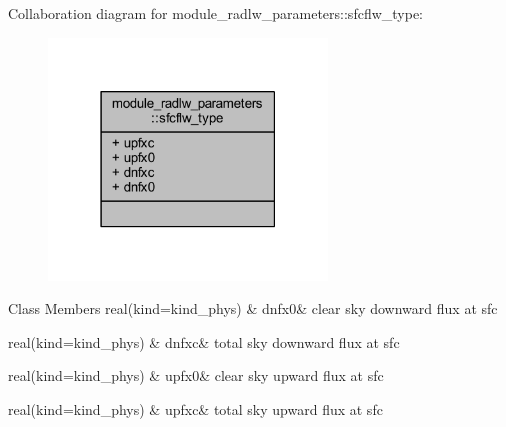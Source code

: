 Collaboration diagram for module\+\_\+radlw\+\_\+parameters\+:\+:sfcflw\+\_\+type\+:\nopagebreak
\begin{figure}[H]
\begin{center}
\leavevmode
\includegraphics[width=210pt]{structmodule__radlw__parameters_1_1sfcflw__type__coll__graph}
\end{center}
\end{figure}
\begin{DoxyFields}{Class Members}
real(kind=kind\+\_\+phys)\hypertarget{group__module__radlw__main_gadac8d084ff59310f6c6f4fdff1a0e5e6}{}\label{group__module__radlw__main_gadac8d084ff59310f6c6f4fdff1a0e5e6}
&
dnfx0&
clear sky downward flux at sfc \\
\hline

real(kind=kind\+\_\+phys)\hypertarget{group__module__radlw__main_gae65c0014042ceffec4293e4d300f9cb8}{}\label{group__module__radlw__main_gae65c0014042ceffec4293e4d300f9cb8}
&
dnfxc&
total sky downward flux at sfc \\
\hline

real(kind=kind\+\_\+phys)\hypertarget{group__module__radlw__main_gab186f43f5f87043de996c1fa6f59dc6e}{}\label{group__module__radlw__main_gab186f43f5f87043de996c1fa6f59dc6e}
&
upfx0&
clear sky upward flux at sfc \\
\hline

real(kind=kind\+\_\+phys)\hypertarget{group__module__radlw__main_gab281301c9fad950c86a379cdec0963aa}{}\label{group__module__radlw__main_gab281301c9fad950c86a379cdec0963aa}
&
upfxc&
total sky upward flux at sfc \\
\hline

\end{DoxyFields}
\label{structmodule__radlw__parameters_1_1proflw__type}
\hypertarget{group__module__radlw__main_structmodule__radlw__parameters_1_1proflw__type}{}
